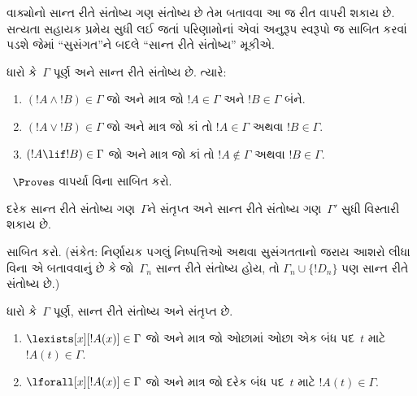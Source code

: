 વાક્યોનો સાન્ત રીતે સંતોષ્ય ગણ સંતોષ્ય છે તેમ બતાવવા આ જ રીત વાપરી
શકાય છે. સત્યતા સહાયક પ્રમેય સુધી લઈ જતાં પરિણામોનાં એવાં અનુરૂપ
સ્વરૂપો જ સાબિત કરવાં પડશે જેમાં ``સુસંગત''ને બદલે ``સાન્ત રીતે
સંતોષ્ય'' મૂકીએ.

\begin{prop}
ધારો કે~$\Gamma$ પૂર્ણ અને સાન્ત રીતે સંતોષ્ય છે. ત્યારે:
\begin{enumerate}
\item $(!A \land !B) \in \Gamma$ જો અને માત્ર જો
  $!A \in \Gamma$ અને $!B \in \Gamma$ બંને.

\item $(!A \lor !B) \in \Gamma$ જો અને માત્ર જો કાં તો
  $!A \in \Gamma$ અથવા $!B \in \Gamma$.

\item $(!A \lif !B) \in \Gamma$ જો અને માત્ર જો કાં તો
  $!A \notin \Gamma$ અથવા $!B \in \Gamma$.
\end{enumerate}
\end{prop}


\begin{prob}
~$\Proves$ વાપર્યા વિના 
સાબિત કરો.
\end{prob}




%
\begin{lem}
 દરેક સાન્ત રીતે સંતોષ્ય ગણ~$\Gamma$ને
સંતૃપ્ત અને સાન્ત રીતે સંતોષ્ય ગણ~$\Gamma'$ સુધી વિસ્તારી શકાય છે.
\end{lem}



\begin{prob}
 સાબિત કરો. (સંકેત: નિર્ણાયક
પગલું નિષ્પત્તિઓ અથવા સુસંગતતાનો જરાય આશરો લીધા વિના એ બતાવવાનું
છે કે જો~$\Gamma_n$ સાન્ત રીતે સંતોષ્ય હોય, તો
$\Gamma_n\cup\{!D_n\}$ પણ સાન્ત રીતે સંતોષ્ય છે.)
\end{prob}


%
\begin{prop}
ધારો કે~$\Gamma$ પૂર્ણ, સાન્ત રીતે સંતોષ્ય અને સંતૃપ્ત છે.
\begin{enumerate}
\item $\lexists[x][!A(x)]\in\Gamma$ જો અને માત્ર જો ઓછામાં
  ઓછા એક બંધ પદ~$t$ માટે $!A(t)\in\Gamma$.
\item $\lforall[x][!A(x)]\in\Gamma$ જો અને માત્ર જો દરેક
  બંધ પદ~$t$ માટે $!A(t)\in\Gamma$.
\end{enumerate}
\end{prop}



